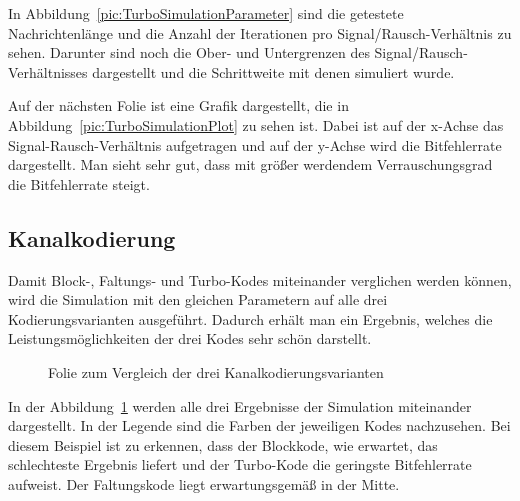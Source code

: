 In Abbildung~\ref{pic:TurboSimulationParameter} sind die getestete Nachrichtenlänge und die Anzahl der Iterationen pro Signal/Rausch-Verhältnis zu sehen. Darunter sind noch die Ober- und Untergrenzen des Signal/Rausch-Verhältnisses dargestellt und die Schrittweite mit denen simuliert wurde.

Auf der nächsten Folie ist eine Grafik dargestellt, die in Abbildung~\ref{pic:TurboSimulationPlot} zu sehen ist. Dabei ist auf der x-Achse das Signal-Rausch-Verhältnis aufgetragen und auf der y-Achse wird die Bitfehlerrate dargestellt. Man sieht sehr gut, dass mit größer werdendem Verrauschungsgrad die Bitfehlerrate steigt.

\FloatBarrier
\subsection{Kanalkodierung}
\label{sec:visualization_simulations_channelcoding}
Damit Block-, Faltungs- und Turbo-Kodes miteinander verglichen werden können, wird die Simulation mit den gleichen Parametern auf alle drei Kodierungsvarianten ausgeführt. Dadurch erhält man ein Ergebnis, welches die Leistungsmöglichkeiten der drei Kodes sehr schön darstellt.

\begin{figure}[th]
\centering
{}
\caption{Folie zum Vergleich der drei Kanalkodierungsvarianten}
\label{pic:ChannelcodingSimulation}
\end{figure}

In der Abbildung~\ref{pic:ChannelcodingSimulation} werden alle drei Ergebnisse der Simulation miteinander dargestellt. In der Legende sind die Farben der jeweiligen Kodes nachzusehen. Bei diesem Beispiel ist zu erkennen, dass der Blockkode, wie erwartet, das schlechteste Ergebnis liefert und der Turbo-Kode die geringste Bitfehlerrate aufweist. Der Faltungskode liegt erwartungsgemäß in der Mitte.

